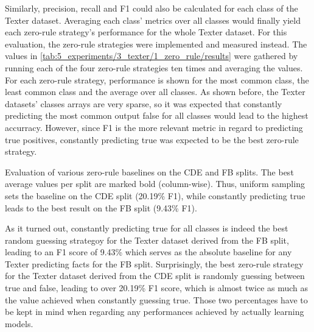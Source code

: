 Similarly, precision, recall and F1 could also be calculated for each class of the Texter dataset. Averaging each class' metrics over all classes would finally yield each zero-rule strategy's performance for the whole Texter dataset. For this evaluation, the zero-rule strategies were implemented and measured instead. The values in \autoref{tab:5_experiments/3_texter/1_zero_rule/results} were gathered by running each of the four zero-rule strategies ten times and averaging the values. For each zero-rule strategy, performance is shown for the most common class, the least common class and the average over all classes. As shown before, the Texter datasets' classes arrays are very sparse, so it was expected that constantly predicting the most common output false for all classes would lead to the highest accurracy. However, since F1 is the more relevant metric in regard to predicting true positives, constantly predicting true was expected to be the best zero-rule strategy.

\begin{table}[t]
    \makebox[\textwidth][c]{
        
    }
    \caption{Evaluation of various zero-rule baselines on the CDE and FB splits. The best average values per split are marked bold (column-wise). Thus, uniform sampling sets the baseline on the CDE split (20.19\% F1), while constantly predicting true leads to the best result on the FB split (9.43\% F1).}
    \label{tab:5_experiments/3_texter/1_zero_rule/results}
\end{table}

As it turned out, constantly predicting true for all classes is indeed the best random guessing strategoy for the Texter dataset derived from the FB split, leading to an F1 score of 9.43\% which serves as the absolute baseline for any Texter predicting facts for the FB split. Surprisingly, the best zero-rule strategy for the Texter dataset derived from the CDE split is randomly guessing between true and false, leading to over 20.19\% F1 score, which is almost twice as much as the value achieved when constantly guessing true. Those two percentages have to be kept in mind when regarding any performances achieved by actually learning models.

